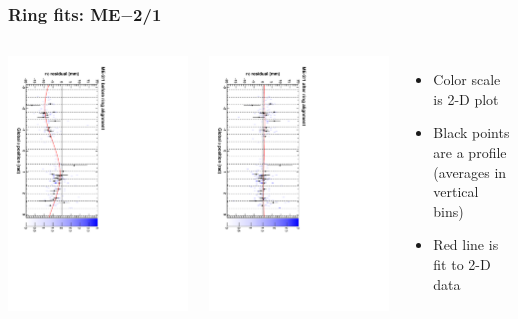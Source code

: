 \documentclass[compress]{beamer}
\begin{document}
\begin{frame}
\frametitle{Ring fits: ME$-$2/1}
\vfill
\begin{columns}
\includegraphics[height=\linewidth, angle=90]{ringfits_before/mem21.pdf}

\includegraphics[height=\linewidth, angle=90]{ringfits_after/mem21.pdf}
\begin{itemize}
\item Color scale is 2-D plot
\item Black points are a profile (averages in vertical bins)
\item Red line is fit to 2-D data
\end{itemize}
\end{columns}
\end{frame}
\end{document}
